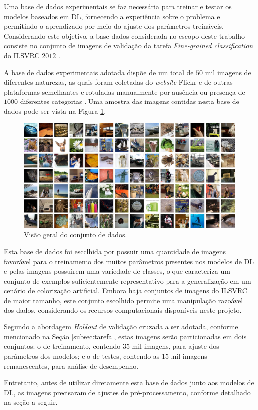 Uma base de dados experimentais se faz necessária para treinar e testar os modelos baseados em DL, fornecendo a experiência sobre o problema e permitindo o aprendizado por meio do ajuste dos parâmetros treináveis. Considerando este objetivo, a base dados considerada no escopo deste trabalho consiste no conjunto de imagens de validação da tarefa \emph{Fine-grained classification} do ILSVRC $2012$ \cite{ref:image-net}.

A base de dados experimentais adotada dispõe de um total de $50$ mil imagens de diferentes naturezas, as quais foram coletadas do \emph{website} Flickr e de outras plataformas semelhantes e rotuladas manualmente por ausência ou presença de $1000$ diferentes categorias \cite{ILSVRC}. Uma amostra das imagens contidas nesta base de dados pode ser vista na Figura \ref{fig:visaogeral}.

\begin{figure}[h]
	\centering
	\caption{Visão geral do conjunto de dados.}
	\label{fig:visaogeral}
	\includegraphics[width=1\textwidth]{./img/visaogeral}
\end{figure}

Esta base de dados foi escolhida por possuir uma quantidade de imagens favorável para o treinamento dos muitos parâmetros presentes nos modelos de DL e pelas imagens possuirem uma variedade de classes, o que caracteriza um conjunto de exemplos suficientemente representativo para a generalização em um cenário de colorização artificial. Embora haja conjuntos de imagens do ILSVRC de maior tamanho, este conjunto escolhido permite uma manipulação razoável dos dados, considerando os recursos computacionais disponíveis neste projeto.

Segundo a abordagem \emph{Holdout} de validação cruzada a ser adotada, conforme mencionado na Seção \ref{subsec:tarefa}, estas imagens serão particionadas em dois conjuntos: o de treinamento, contendo $35$ mil imagens, para ajuste dos parâmetros dos modelos; e o de testes, contendo as $15$ mil imagens remanescentes, para análise de desempenho.

Entretanto, antes de utilizar diretamente esta base de dados junto aos modelos de DL, as imagens precisaram de ajustes de pré-processamento, conforme detalhado na seção a seguir.
